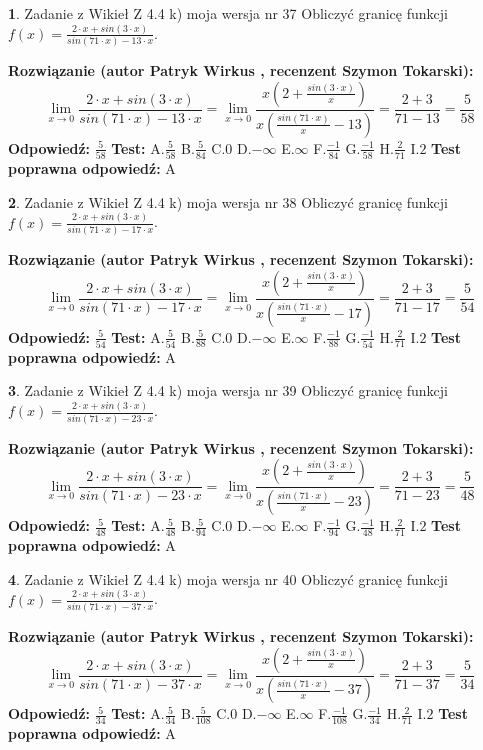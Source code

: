 \documentclass[12pt, a4paper]{article}
\theoremstyle{definition} %
\newtheorem{zad}{}
\newcommand{\zadStart}[1]{\begin{zad}#1\newline}
\newcommand{\zadStop}{\end{zad}}
\newcommand{\rozwStart}[2]{\noindent \textbf{Rozwiązanie (autor #1 , recenzent #2): }\newline}
\newcommand{\rozwStop}{\newline}
\newcommand{\odpStart}{\noindent \textbf{Odpowiedź:}\newline}
\newcommand{\odpStop}{\newline}
\newcommand{\testStart}{\noindent \textbf{Test:}\newline}
\newcommand{\testStop}{\newline}
\newcommand{\kluczStart}{\noindent \textbf{Test poprawna odpowiedź:}\newline}
\newcommand{\kluczStop}{\newline}
\begin{document}
\zadStart{Zadanie z Wikieł Z 4.4 k) moja wersja nr 37}
Obliczyć granicę funkcji $f(x)=\frac{2\cdot x +sin(3\cdot x)}{sin(71\cdot x) -13\cdot x}$.
\zadStop
\rozwStart{Patryk Wirkus}{Szymon Tokarski}
$$\lim\limits_{x\to 0}\frac{2\cdot x +sin(3\cdot x)}{sin(71\cdot x) -13\cdot x}
=\lim\limits_{x\to 0}\frac{x(2+\frac{sin(3\cdot x)}{x})}{x(\frac{sin(71\cdot x)}{x}-13)}
=\frac{2+3}{71-13} = \frac{5}{58}$$
\rozwStop
\odpStart
$\frac{5}{58}$
\odpStop
\testStart
A.$\frac{5}{58}$
B.$\frac{5}{84}$
C.$0$
D.$-\infty$
E.$\infty$
F.$\frac{-1}{84}$
G.$\frac{-1}{58}$
H.$\frac{2}{71}$
I.$2$
\testStop
\kluczStart
A
\kluczStop



\zadStart{Zadanie z Wikieł Z 4.4 k) moja wersja nr 38}
Obliczyć granicę funkcji $f(x)=\frac{2\cdot x +sin(3\cdot x)}{sin(71\cdot x) -17\cdot x}$.
\zadStop
\rozwStart{Patryk Wirkus}{Szymon Tokarski}
$$\lim\limits_{x\to 0}\frac{2\cdot x +sin(3\cdot x)}{sin(71\cdot x) -17\cdot x}
=\lim\limits_{x\to 0}\frac{x(2+\frac{sin(3\cdot x)}{x})}{x(\frac{sin(71\cdot x)}{x}-17)}
=\frac{2+3}{71-17} = \frac{5}{54}$$
\rozwStop
\odpStart
$\frac{5}{54}$
\odpStop
\testStart
A.$\frac{5}{54}$
B.$\frac{5}{88}$
C.$0$
D.$-\infty$
E.$\infty$
F.$\frac{-1}{88}$
G.$\frac{-1}{54}$
H.$\frac{2}{71}$
I.$2$
\testStop
\kluczStart
A
\kluczStop



\zadStart{Zadanie z Wikieł Z 4.4 k) moja wersja nr 39}
Obliczyć granicę funkcji $f(x)=\frac{2\cdot x +sin(3\cdot x)}{sin(71\cdot x) -23\cdot x}$.
\zadStop
\rozwStart{Patryk Wirkus}{Szymon Tokarski}
$$\lim\limits_{x\to 0}\frac{2\cdot x +sin(3\cdot x)}{sin(71\cdot x) -23\cdot x}
=\lim\limits_{x\to 0}\frac{x(2+\frac{sin(3\cdot x)}{x})}{x(\frac{sin(71\cdot x)}{x}-23)}
=\frac{2+3}{71-23} = \frac{5}{48}$$
\rozwStop
\odpStart
$\frac{5}{48}$
\odpStop
\testStart
A.$\frac{5}{48}$
B.$\frac{5}{94}$
C.$0$
D.$-\infty$
E.$\infty$
F.$\frac{-1}{94}$
G.$\frac{-1}{48}$
H.$\frac{2}{71}$
I.$2$
\testStop
\kluczStart
A
\kluczStop



\zadStart{Zadanie z Wikieł Z 4.4 k) moja wersja nr 40}
Obliczyć granicę funkcji $f(x)=\frac{2\cdot x +sin(3\cdot x)}{sin(71\cdot x) -37\cdot x}$.
\zadStop
\rozwStart{Patryk Wirkus}{Szymon Tokarski}
$$\lim\limits_{x\to 0}\frac{2\cdot x +sin(3\cdot x)}{sin(71\cdot x) -37\cdot x}
=\lim\limits_{x\to 0}\frac{x(2+\frac{sin(3\cdot x)}{x})}{x(\frac{sin(71\cdot x)}{x}-37)}
=\frac{2+3}{71-37} = \frac{5}{34}$$
\rozwStop
\odpStart
$\frac{5}{34}$
\odpStop
\testStart
A.$\frac{5}{34}$
B.$\frac{5}{108}$
C.$0$
D.$-\infty$
E.$\infty$
F.$\frac{-1}{108}$
G.$\frac{-1}{34}$
H.$\frac{2}{71}$
I.$2$
\testStop
\kluczStart
A
\kluczStop
\end{document}
